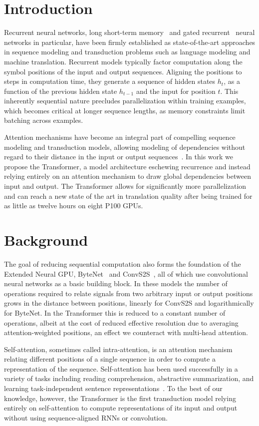 \documentclass[conference]{IEEEtran}
\begin{document}
\section{Introduction}
Recurrent neural networks, long short-term memory~\cite{hochreiter1997} and gated
recurrent~\cite{cho2014} neural networks in particular, have been firmly
established as state-of-the-art approaches in sequence modeling and transduction
problems such as language modeling and machine translation. Recurrent models
typically factor computation along the symbol positions of the input and output
sequences. Aligning the positions to steps in computation time, they generate a
sequence of hidden states $h_t$, as a function of the previous hidden state
$h_{t-1}$ and the input for position $t$. This inherently sequential nature
precludes parallelization within training examples, which becomes critical at
longer sequence lengths, as memory constraints limit batching across examples.

Attention mechanisms have become an integral part of compelling sequence modeling
and transduction models, allowing modeling of dependencies without regard to
their distance in the input or output sequences~\cite{bahdanau2015}. In this work
we propose the Transformer, a model architecture eschewing recurrence and instead
relying entirely on an attention mechanism to draw global dependencies between
input and output. The Transformer allows for significantly more parallelization
and can reach a new state of the art in translation quality after being trained
for as little as twelve hours on eight P100 GPUs.

\section{Background}
The goal of reducing sequential computation also forms the foundation of the
Extended Neural GPU, ByteNet~\cite{kalchbrenner2016} and
ConvS2S~\cite{gehring2017}, all of which use convolutional neural networks as a
basic building block. In these models the number of operations required to relate
signals from two arbitrary input or output positions grows in the distance
between positions, linearly for ConvS2S and logarithmically for ByteNet. In the
Transformer this is reduced to a constant number of operations, albeit at the cost
of reduced effective resolution due to averaging attention-weighted positions, an
effect we counteract with multi-head attention.

Self-attention, sometimes called intra-attention, is an attention mechanism
relating different positions of a single sequence in order to compute a
representation of the sequence. Self-attention has been used successfully in a
variety of tasks including reading comprehension, abstractive summarization, and
learning task-independent sentence representations~\cite{cheng2016,lin2017}. To
the best of our knowledge, however, the Transformer is the first transduction
model relying entirely on self-attention to compute representations of its input
and output without using sequence-aligned RNNs or convolution.
\end{document}
